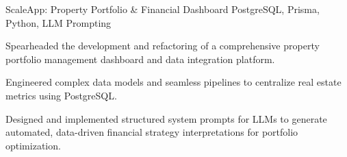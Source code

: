 \resumeSubheading
  {ScaleApp: Property Portfolio \& Financial Dashboard}{}
  {PostgreSQL, Prisma, Python, LLM Prompting}{}
  \resumeItemListStart
    \item \small{Spearheaded the development and refactoring of a comprehensive property portfolio management dashboard and data integration platform.}
    \item \small{Engineered complex data models and seamless pipelines to centralize real estate metrics using PostgreSQL.}
    \item \small{Designed and implemented structured system prompts for LLMs to generate automated, data-driven financial strategy interpretations for portfolio optimization.}
  \resumeItemListEnd
